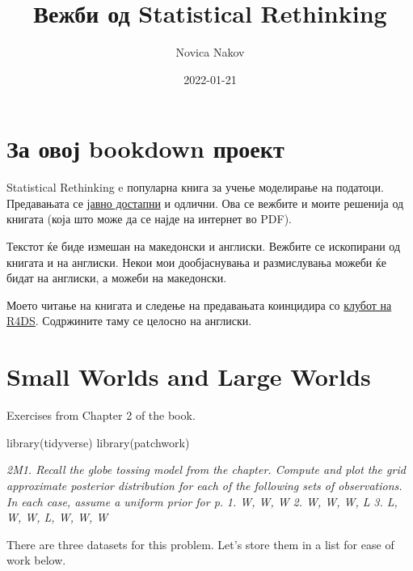 \documentclass[
]{book}
\title{Вежби од Statistical Rethinking}
\author{Novica Nakov}
\date{2022-01-21}
\newenvironment{Shaded}{\begin{snugshade}}{\end{snugshade}}
\newcommand{\FunctionTok}[1]{\textcolor[rgb]{0.00,0.00,0.00}{#1}}
\newcommand{\NormalTok}[1]{#1}
\begin{document}
\maketitle

{
\setcounter{tocdepth}{1}
\tableofcontents
}
\hypertarget{ux437ux430-ux43eux432ux43eux458-bookdown-ux43fux440ux43eux435ux43aux442}{%
\chapter{За овој bookdown проект}\label{ux437ux430-ux43eux432ux43eux458-bookdown-ux43fux440ux43eux435ux43aux442}}

Statistical Rethinking e популарна книга за учење моделирање на податоци. Предавањата се \href{https://github.com/rmcelreath/stat_rethinking_2022}{јавно достапни} и одлични. Ова се вежбите и моите решенија од книгата (која што може да се најде на интернет во PDF).

Текстот ќе биде измешан на македонски и англиски. Вежбите се ископирани од книгата и на англиски. Некои мои дообјаснувања и размислувања можеби ќе бидат на англиски, а можеби на македонски.

Моето читање на книгата и следење на предавањата коинцидира со \href{https://r4ds.github.io/bookclub-statrethink/}{клубот на R4DS}. Содржините таму се целосно на англиски.

\hypertarget{small-worlds-and-large-worlds}{%
\chapter{Small Worlds and Large Worlds}\label{small-worlds-and-large-worlds}}

Exercises from Chapter 2 of the book.

\begin{Shaded}
\begin{Highlighting}[]
\FunctionTok{library}\NormalTok{(tidyverse)}
\FunctionTok{library}\NormalTok{(patchwork)}
\end{Highlighting}
\end{Shaded}

\emph{2M1. Recall the globe tossing model from the chapter. Compute and plot the grid approximate posterior distribution for each of the following sets of observations. In each case, assume a uniform prior for p.}
\emph{1. W, W, W}
\emph{2. W, W, W, L}
\emph{3. L, W, W, L, W, W, W}

There are three datasets for this problem. Let's store them in a list for ease of work below.
\end{document}
